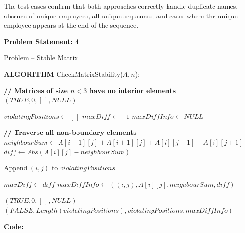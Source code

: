 \documentclass[12pt]{article}
\begin{document}
The test cases confirm that both approaches correctly handle duplicate names, absence of unique employees, all-unique sequences, and cases where the unique employee appears at the end of the sequence.


\newpage

\textbf{Problem Statement: 4}

Problem – Stable Matrix

\begin{algorithm}[H]
\caption{CheckMatrixStability}
\begin{algorithmic}[1]

\State \textbf{ALGORITHM} CheckMatrixStability($A, n$):

\State \textbf{// Matrices of size $n < 3$ have no interior elements}
    \State \Return $(TRUE, 0, [\ ], NULL)$
\EndIf

\State $violatingPositions \gets [\ ]$
\State $maxDiff \gets -1$
\State $maxDiffInfo \gets NULL$

\State \textbf{// Traverse all non-boundary elements}
        \State $neighbourSum \gets A[i-1][j] + A[i+1][j] + A[i][j-1] + A[i][j+1]$
        \State $diff \gets Abs(A[i][j] - neighbourSum)$

            \State Append $(i,j)$ to $violatingPositions$

                \State $maxDiff \gets diff$
                \State $maxDiffInfo \gets ((i,j), A[i][j], neighbourSum, diff)$
            \EndIf
        \EndIf
    \EndFor
\EndFor

    \State \Return $(TRUE, 0, [\ ], NULL)$
\Else
    \State \Return $(FALSE, Length(violatingPositions), violatingPositions, maxDiffInfo)$
\EndIf

\end{algorithmic}
\end{algorithm}

\textbf{Code:}
\end{document}
